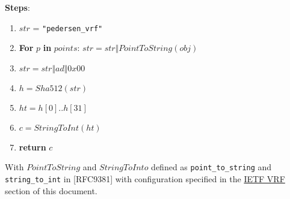 \documentclass[
]{article}
\providecommand{\tightlist}{%
  \setlength{\itemsep}{0pt}\setlength{\parskip}{0pt}}
\begin{document}
\textbf{Steps}:

\begin{enumerate}
\def\labelenumi{\arabic{enumi}.}
\tightlist
\item
  \(str\) = \texttt{"pedersen\_vrf"}
\item
  \textbf{For} \(p\) \textbf{in} \(points\):
  \(str = str \Vert PointToString(obj)\)
\item
  \(str = str \Vert ad \Vert 0x00\)
\item
  \(h = Sha512(str)\)
\item
  \(ht = h[0] .. h[31]\)
\item
  \(c = StringToInt(ht)\)
\item
  \textbf{return} \(c\)
\end{enumerate}

With \(PointToString\) and \(StringToInto\) defined as
\texttt{point\_to\_string} and \texttt{string\_to\_int} in {[}RFC9381{]}
with configuration specified in the \protect\hyperlink{ietf-vrf}{IETF
VRF} section of this document.
\end{document}

